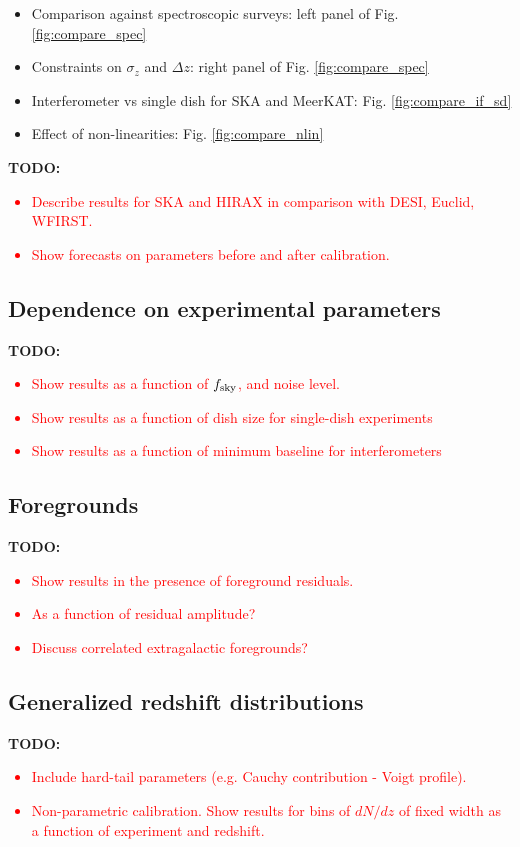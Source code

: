 \documentclass[prd,twocolumn]{revtex4}
\newcommand{\TODO}[1]{{\bf TODO:} \textcolor{red}{#1}}
\begin{document}
    \begin{itemize}
     \item Comparison against spectroscopic surveys: left panel of Fig. \ref{fig:compare_spec}
     \item Constraints on $\sigma_z$ and $\Delta z$: right panel of Fig. \ref{fig:compare_spec}
     \item Interferometer vs single dish for SKA and MeerKAT: Fig. \ref{fig:compare_if_sd}
     \item Effect of non-linearities: Fig. \ref{fig:compare_nlin}
    \end{itemize}

    \TODO{
      \begin{itemize}
        \item Describe results for SKA and HIRAX in comparison with DESI, Euclid, WFIRST.
        \item Show forecasts on parameters before and after calibration.
      \end{itemize}
    }

  \subsection{Dependence on experimental parameters} \label{ssec:results.params}
    \TODO{
      \begin{itemize}
        \item Show results as a function of $f_{\rm sky}$, and noise level.
        \item Show results as a function of dish size for single-dish experiments
        \item Show results as a function of minimum baseline for interferometers
      \end{itemize}
    }

  \subsection{Foregrounds} \label{ssec:results.foregrounds}
    \TODO{
      \begin{itemize}
        \item Show results in the presence of foreground residuals.
        \item As a function of residual amplitude?
        \item Discuss correlated extragalactic foregrounds?
      \end{itemize}
    }

  \subsection{Generalized redshift distributions} \label{ssec:results.outliers}
    \TODO{
      \begin{itemize}
        \item Include hard-tail parameters (e.g. Cauchy contribution - Voigt profile).
        \item Non-parametric calibration. Show results for bins of $dN/dz$ of fixed
          width as a function of experiment and redshift.
      \end{itemize}
    }
    
\end{document}
